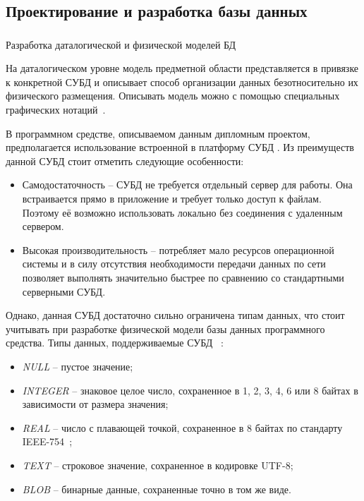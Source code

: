 \subsection{Проектирование и разработка базы данных}
\label{sec:design:database}

\subsubsection{} Разработка даталогической и физической моделей БД
\label{sec:design:database:model}

На даталогическом уровне модель предметной области представляется в привязке к конкретной СУБД и описывает способ организации данных безотносительно их физического размещения.
Описывать модель можно с помощью специальных графических нотаций~\cite{kulikov_db_workbook}.

В программном средстве, описываемом данным дипломным проектом, предполагается использование встроенной в платформу \andro СУБД \sqlite.
Из преимуществ данной СУБД стоит отметить следующие особенности:
\begin{itemize}
    \item Самодостаточность -- СУБД \sqlite не требуется отдельный сервер для работы.
    Она встраивается прямо в приложение и требует только доступ к файлам.
    Поэтому её возможно использовать локально без соединения с удаленным сервером.
    \item Высокая производительность – \sqlite потребляет мало ресурсов операционной системы и в силу отсутствия необходимости передачи данных по сети позволяет выполнять значительно быстрее по сравнению со стандартными серверными СУБД.
\end{itemize}

Однако, данная СУБД достаточно сильно ограничена типам данных, что стоит учитывать при разработке физической модели базы данных программного средства.
Типы данных, поддерживаемые СУБД \sqlite~\cite{sqlite_types}:
\begin{itemize}
    \item \emph{NULL} -- пустое значение;
    \item \emph{INTEGER} -- знаковое целое число, сохраненное в 1, 2, 3, 4, 6 или 8 байтах в зависимости от размера значения;
    \item \emph{REAL} -- число с плавающей точкой, сохраненное в 8 байтах по стандарту IEEE-754~\cite{ieee_754};
    \item \emph{TEXT} -- строковое значение, сохраненное в кодировке UTF-8;
    \item \emph{BLOB} -- бинарные данные, сохраненные точно в том же виде.
\end{itemize}

